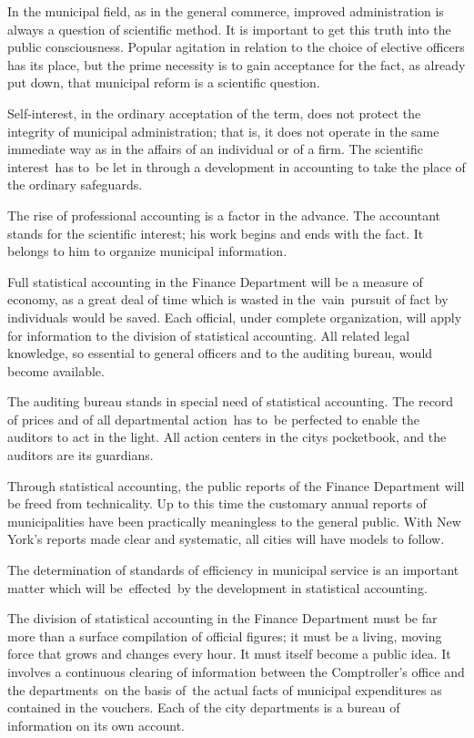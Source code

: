 \documentclass[openany,nobib]{tufte-book}
\begin{document}
In the municipal field, as in the general commerce, improved
administration is always a question of scientific method. It is
important to get this truth into the public consciousness. Popular
agitation in relation to the choice of elective officers has its place,
but the prime necessity is to gain acceptance for the fact, as already
put down, that municipal reform is a scientific question.~

Self-interest, in the ordinary acceptation of the term, does not protect
the integrity of municipal administration; that is, it does not operate
in the same immediate way as in the affairs of an individual or of a
firm. The scientific interest~has to~be let in through a development in
accounting to take the place of the ordinary safeguards.~

The rise of professional accounting is a factor in the advance. The
accountant stands for the scientific interest; his work begins and ends
with the fact. It belongs to him to organize municipal information.~

Full statistical accounting in the Finance Department will be a measure
of economy, as a great deal of time which is wasted in the~vain~pursuit
of fact by individuals would be saved. Each official, under complete
organization, will apply for information to the division of statistical
accounting. All related legal knowledge, so essential to general
officers and to the auditing bureau, would become available.~

The auditing bureau stands in special need of statistical accounting.
The record of prices and of all departmental action~has to~be perfected
to enable the auditors to act in the light. All action centers in the
city\textquotesingle s pocketbook, and the auditors are its guardians.~

Through statistical accounting, the public reports of the Finance
Department will be freed from technicality. Up to this time the
customary annual reports of municipalities have been practically
meaningless to the general public. With New York's reports made clear
and systematic, all cities will have models to follow.~

The determination of standards of efficiency in municipal service is an
important matter which will be~effected~by the development in
statistical accounting.

The division of statistical accounting in the Finance Department must be
far more than a surface compilation of official figures; it must be a
living, moving force that grows and changes every hour. It must itself
become a public idea. It involves a continuous clearing of information
between the Comptroller's office and the departments~on the basis of~the
actual facts of municipal expenditures as contained in the vouchers.
Each of the city departments is a bureau of information on its own
account.
\end{document}
